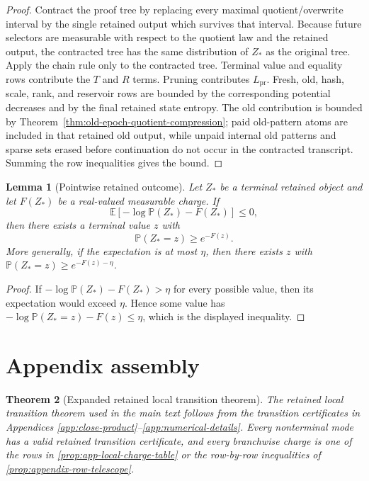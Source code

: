 \documentclass[11pt]{article}
\newcommand{\Cref}[1]{\ref{#1}}
\newtheorem{theorem}{Theorem}[section]
\newtheorem{lemma}[theorem]{Lemma}
\theoremstyle{remark}
\newcommand{\E}{\mathbb E}
\newcommand{\Prob}{\mathbb P}
\newcommand{\pr}{\mathrm{pr}}
\begin{document}
\begin{proof}
Contract the proof tree by replacing every maximal quotient/overwrite interval by the single retained output which survives that interval.  Because future selectors are measurable with respect to the quotient law and the retained output, the contracted tree has the same distribution of $Z_*$ as the original tree.  Apply the chain rule only to the contracted tree.  Terminal value and equality rows contribute the $T$ and $R$ terms.  Pruning contributes $L_{\pr}$.  Fresh, old, hash, scale, rank, and reservoir rows are bounded by the corresponding potential decreases and by the final retained state entropy.  The old contribution is bounded by Theorem~\ref{thm:old-epoch-quotient-compression}; paid old-pattern atoms are included in that retained old output, while unpaid internal old patterns and sparse sets erased before continuation do not occur in the contracted transcript.  Summing the row inequalities gives the bound.
\end{proof}

\begin{lemma}[Pointwise retained outcome]\label{lem:pointwise-retained-outcome}
Let $Z_*$ be a terminal retained object and let $F(Z_*)$ be a real-valued measurable charge.  If
\[
        \E[-\log \Prob(Z_*)-F(Z_*)]\le 0,
\]
then there exists a terminal value $z$ with
\[
        \Prob(Z_*=z)\ge e^{-F(z)}.
\]
More generally, if the expectation is at most $\eta$, then there exists $z$ with $\Prob(Z_*=z)\ge e^{-F(z)-\eta}$.
\end{lemma}

\begin{proof}
If $-\log\Prob(Z_*)-F(Z_*)>\eta$ for every possible value, then its expectation would exceed $\eta$.  Hence some value has $-\log\Prob(Z_*=z)-F(z)\le\eta$, which is the displayed inequality.
\end{proof}

\section{Appendix assembly}\label{app:assembly}

\begin{theorem}[Expanded retained local transition theorem]\label{thm:app-expanded-local}
The retained local transition theorem used in the main text follows from the transition certificates in Appendices \ref{app:close-product}--\ref{app:numerical-details}.  Every nonterminal mode has a valid retained transition certificate, and every branchwise charge is one of the rows in \Cref{prop:app-local-charge-table} or the row-by-row inequalities of \Cref{prop:appendix-row-telescope}.
\end{theorem}
\end{document}
